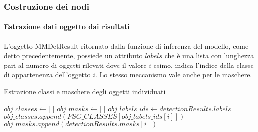 \subsubsection{Costruzione dei nodi}
\paragraph{Estrazione dati oggetto dai risultati}
L'oggetto MMDetResult ritornato dalla funzione di inferenza del modello, come detto precedentemente, possiede un attributo $labels$ che è una lista con lunghezza pari al numero di oggetti rilevati dove il valore $i$-esimo, indica l'indice della classe di appartenenza dell'oggetto $i$. Lo stesso meccanismo vale anche per le maschere.

\begin{algorithm}
  \caption{Estrazione classi e maschere degli oggetti individuati}
  \begin{algorithmic}[1]
    \State $obj\_classes \gets \text{[ ]}$
    \State $obj\_masks \gets \text{[ ]}$
    \State $obj\_labels\_ids \gets detectionResults.labels$
    \State $obj\_classes.append(PSG\_CLASSES[obj\_labels\_ids[i]])$
    \State $obj\_masks.append(detectionResults.masks[i])$
    \EndFor
  \end{algorithmic}
\end{algorithm}


